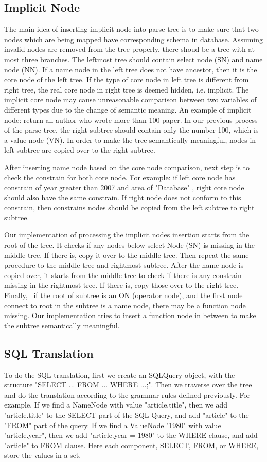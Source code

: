 \documentclass[twocolumn]{article}
\begin{document}
\subsection{Implicit Node}
The main idea of inserting implicit node into parse tree is to make sure that two nodes which are being mapped have corresponding schema in database. Assuming invalid nodes are removed from the tree properly, there shoud be a tree with at most three branches. The leftmost tree should contain select node (SN) and name node (NN). If a name node in the left tree does not have ancestor, then it is the core node of the left tree. If the type of core node in left tree is different from right tree, the real core node in right tree is deemed hidden, i.e. implicit. The implicit core node may cause unreasonable comparison between two variables of different types due to the change of semantic meaning. An example of implicit node: return all author who wrote more than 100 paper. In our previous process of the parse tree, the right subtree should contain only the number 100, which is a value node (VN). In order to make the tree semantically meaningful, nodes in left subtree are copied over to the right subtree.

After inserting name node based on the core node comparison, next step is to check the constrain for both core node. For example: if left core node has constrain of year greater than 2007 and area of "Database" , right core node should also have the same constrain. If right node does not conform to this constrain, then constrains nodes should be copied from the left subtree to right subtree. 

Our implementation of processing the implicit nodes insertion starts from the root of the tree. It checks if any nodes below select Node (SN) is missing in the middle tree. If there is, copy it over to the middle tree. Then repeat the same procedure to the middle tree and rightmost subtree. After the name node is copied over, it starts from the middle tree to check if there is any constrain missing in the rightmost tree. If there is, copy those over to the right tree. Finally,  if the root of subtree is an ON (operator node), and the first node connect to root in the subtree is a name node, there may be a function node missing. Our implementation tries to insert a function node in between to make the subtree semantically meaningful. 

\subsection{SQL Translation}
To do the SQL translation, first we create an SQLQuery object, with the structure "SELECT ... FROM ... WHERE ...;". Then we traverse over the tree and do the translation according to the grammar rules defined previously. For example, If we find a NameNode with value "article.title", then we add "article.title" to the SELECT part of the SQL Query, and add "article" to the "FROM" part of the query. If we find a ValueNode "1980" with value "article.year", then we add "article.year = 1980" to the WHERE clause, and add "article" to FROM clause. Here each component, SELECT, FROM, or WHERE, store the values in a set.
\end{document}
